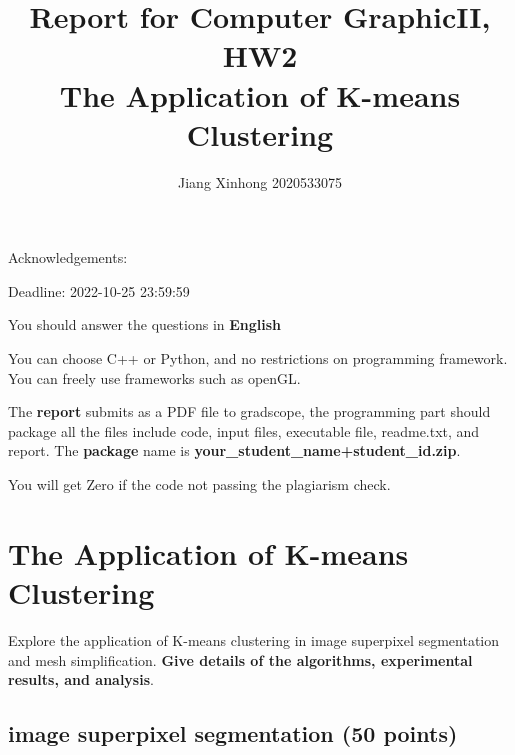 \documentclass[]{article}
\title{Report for Computer GraphicII, HW2 \\ The Application of K-means Clustering }
\author{Jiang Xinhong 2020533075}
\begin{document}
\maketitle
Acknowledgements:

Deadline: 2022-10-25 23:59:59


You should answer the questions in \textbf{English}


You can choose C++ or Python, and no restrictions on programming framework. You can freely use frameworks such as openGL.

The \textbf{report} submits as a PDF file to gradscope, the programming part should package all the files include code, input files, executable file, readme.txt, and report. The \textbf{package} name is  \textbf{your\_student\_name+student\_id.zip}.

You will get Zero if the code not passing the plagiarism check.
\newpage
\section{The Application of K-means Clustering}

Explore the application of K-means clustering in image superpixel segmentation and mesh simplification. \textbf{Give details of the algorithms, experimental results, and analysis}.

\subsection{image superpixel segmentation (50 points)}
\end{document}
